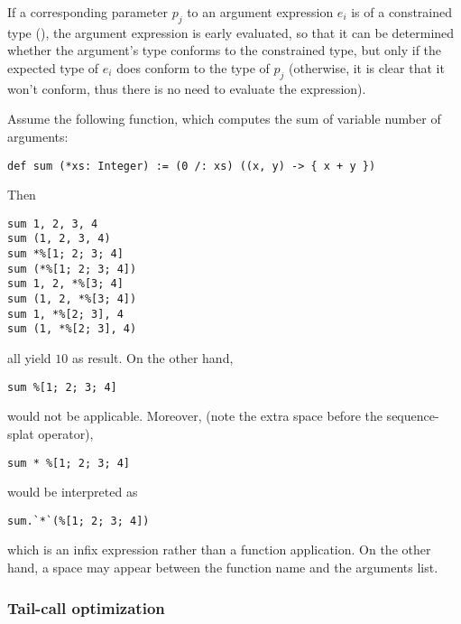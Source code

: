 If a corresponding parameter $p_j$ to an argument expression $e_i$ is of a constrained type (), the argument expression is early evaluated, so that it can be determined whether the argument's type conforms to the constrained type, but only if the expected type of $e_i$ does conform to the type of $p_j$ (otherwise, it is clear that it won't conform, thus there is no need to evaluate the expression). 

\example Assume the following function, which computes the sum of variable number of arguments:
\begin{lstlisting}
def sum (*xs: Integer) := (0 /: xs) ((x, y) -> { x + y })
\end{lstlisting}
Then 
\begin{lstlisting}
sum 1, 2, 3, 4
sum (1, 2, 3, 4)
sum *%[1; 2; 3; 4]
sum (*%[1; 2; 3; 4])
sum 1, 2, *%[3; 4]
sum (1, 2, *%[3; 4])
sum 1, *%[2; 3], 4
sum (1, *%[2; 3], 4)
\end{lstlisting}
all yield $10$ as result. On the other hand,
\begin{lstlisting}
sum %[1; 2; 3; 4]
\end{lstlisting}
would not be applicable. Moreover, (note the extra space before the sequence-splat operator),
\begin{lstlisting}
sum * %[1; 2; 3; 4]
\end{lstlisting}
would be interpreted as 
\begin{lstlisting}
sum.`*`(%[1; 2; 3; 4])
\end{lstlisting}
which is an infix expression rather than a function application. On the other hand, a space may appear between the function name and the arguments list.





\subsubsection{Tail-call optimization}

